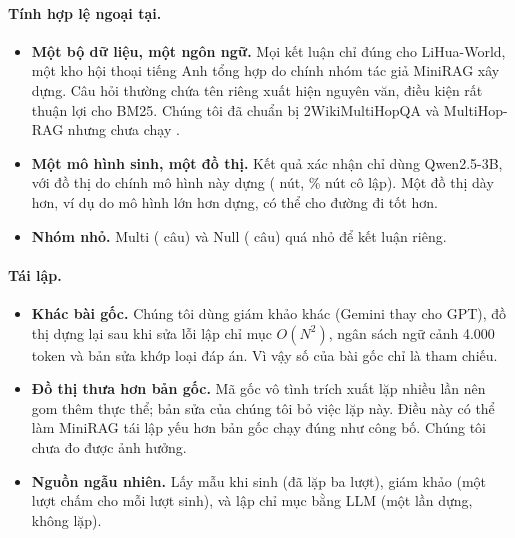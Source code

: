 \paragraph{Tính hợp lệ ngoại tại.}
\begin{itemize}
  \item \textbf{Một bộ dữ liệu, một ngôn ngữ.} Mọi kết luận chỉ đúng cho LiHua-World, một kho hội thoại tiếng Anh tổng hợp do chính nhóm tác giả MiniRAG xây dựng.
  Câu hỏi thường chứa tên riêng xuất hiện nguyên văn, điều kiện rất thuận lợi cho BM25.
  Chúng tôi đã chuẩn bị 2WikiMultiHopQA và MultiHop-RAG nhưng chưa chạy .
  \item \textbf{Một mô hình sinh, một đồ thị.} Kết quả xác nhận chỉ dùng Qwen2.5-3B, với đồ thị do chính mô hình này dựng (\graphNodes{} nút, \graphIsolated\% nút cô lập).
  Một đồ thị dày hơn, ví dụ do mô hình lớn hơn dựng, có thể cho đường đi tốt hơn.
  \item \textbf{Nhóm nhỏ.} Multi (\nHeldMulti{} câu) và Null (\nHeldNull{} câu) quá nhỏ để kết luận riêng.
\end{itemize}

\paragraph{Tái lập.}
\begin{itemize}
  \item \textbf{Khác bài gốc.} Chúng tôi dùng giám khảo khác (Gemini thay cho GPT), đồ thị dựng lại sau khi sửa lỗi lập chỉ mục $O(N^2)$, ngân sách ngữ cảnh 4.000 token và bản sửa khớp loại đáp án.
  Vì vậy số của bài gốc chỉ là tham chiếu.
  \item \textbf{Đồ thị thưa hơn bản gốc.} Mã gốc vô tình trích xuất lặp nhiều lần nên gom thêm thực thể; bản sửa của chúng tôi bỏ việc lặp này.
  Điều này có thể làm MiniRAG tái lập yếu hơn bản gốc chạy đúng như công bố. Chúng tôi chưa đo được ảnh hưởng.
  \item \textbf{Nguồn ngẫu nhiên.} Lấy mẫu khi sinh (đã lặp ba lượt), giám khảo (một lượt chấm cho mỗi lượt sinh), và lập chỉ mục bằng LLM (một lần dựng, không lặp).
\end{itemize}

